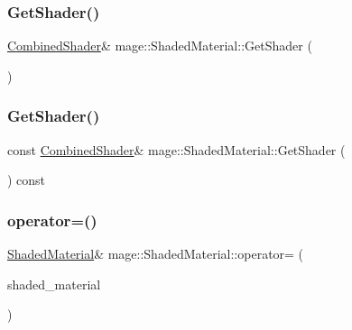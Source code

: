 \hypertarget{structmage_1_1_shaded_material_a1138a96b289a841920f39553ebb230d1}{}\label{structmage_1_1_shaded_material_a1138a96b289a841920f39553ebb230d1} 
\subsubsection{\texorpdfstring{Get\+Shader()}{GetShader()}\hspace{0.1cm}{\footnotesize\ttfamily [1/2]}}
{\footnotesize\ttfamily \hyperlink{structmage_1_1_combined_shader}{Combined\+Shader}\& mage\+::\+Shaded\+Material\+::\+Get\+Shader (\begin{DoxyParamCaption}{ }\end{DoxyParamCaption})}

\hypertarget{structmage_1_1_shaded_material_ac03da6f1dfd81fc19da5a8f8214662ee}{}\label{structmage_1_1_shaded_material_ac03da6f1dfd81fc19da5a8f8214662ee} 
\subsubsection{\texorpdfstring{Get\+Shader()}{GetShader()}\hspace{0.1cm}{\footnotesize\ttfamily [2/2]}}
{\footnotesize\ttfamily const \hyperlink{structmage_1_1_combined_shader}{Combined\+Shader}\& mage\+::\+Shaded\+Material\+::\+Get\+Shader (\begin{DoxyParamCaption}{ }\end{DoxyParamCaption}) const}

\hypertarget{structmage_1_1_shaded_material_ade9ec3ee6aae198e695240a5b89a0d72}{}\label{structmage_1_1_shaded_material_ade9ec3ee6aae198e695240a5b89a0d72} 
\subsubsection{\texorpdfstring{operator=()}{operator=()}}
{\footnotesize\ttfamily \hyperlink{structmage_1_1_shaded_material}{Shaded\+Material}\& mage\+::\+Shaded\+Material\+::operator= (\begin{DoxyParamCaption}\item[{const \hyperlink{structmage_1_1_shaded_material}{Shaded\+Material} \&}]{shaded\+\_\+material }\end{DoxyParamCaption})\hspace{0.3cm}{\ttfamily [default]}}

